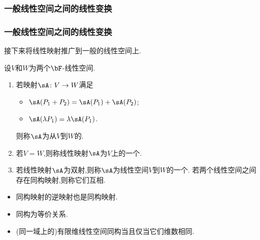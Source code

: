\subsubsection{一般线性空间之间的线性变换}
\begin{frame}\frametitle{一般线性空间之间的线性变换}

接下来将线性映射推广到一般的线性空间上.

\begin{definition}
设$V$和$W$为两个$\bF$-线性空间.

\begin{enumerate}
\item 若映射$\sA\colon V\rightarrow W$满足
\begin{itemize}
\item  $\sA(P_1 + P_2) = \sA( P_1) + \sA(P_2)$;
\item  $\sA(\lambda P_1) = \lambda\sA( P_1)$.
\end{itemize}
则称$\sA$为从$V$到$W$的.
\item 若$V=W$,则称线性映射$\sA$为$V$上的一个.
\item 若线性映射$\sA$为双射,则称$\sA$为线性空间$V$到$W$的一个. 若两个线性空间之间存在同构映射,则称它们互相.
\end{enumerate}
\end{definition}
\pp
\begin{proposition}[同构基本性质]
\begin{itemize}
\item 同构映射的逆映射也是同构映射.
\pp
\item 同构为等价关系.
\pp
\item (同一域上的)有限维线性空间同构当且仅当它们维数相同.
\end{itemize}
\end{proposition}

\end{frame}






